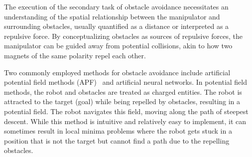 \documentclass[a4paper]{article}
\begin{document}
%
%
%

The execution of the secondary task of obstacle avoidance necessitates an understanding of the spatial relationship between the manipulator and surrounding obstacles, usually quantified as a distance or interpreted as a repulsive force. By conceptualizing obstacles as sources of repulsive forces, the manipulator can be guided away from potential collisions, akin to how two magnets of the same polarity repel each other.

Two commonly employed methods for obstacle avoidance include artificial potential field methods (APF)~\cite{Khatib1985} and artificial neural networks. In potential field methods, the robot and obstacles are treated as charged entities. The robot is attracted to the target (goal) while being repelled by obstacles, resulting in a potential field. The robot navigates this field, moving along the path of steepest descent. While this method is intuitive and relatively easy to implement, it can sometimes result in local minima problems where the robot gets stuck in a position that is not the target but cannot find a path due to the repelling obstacles.
\end{document}
